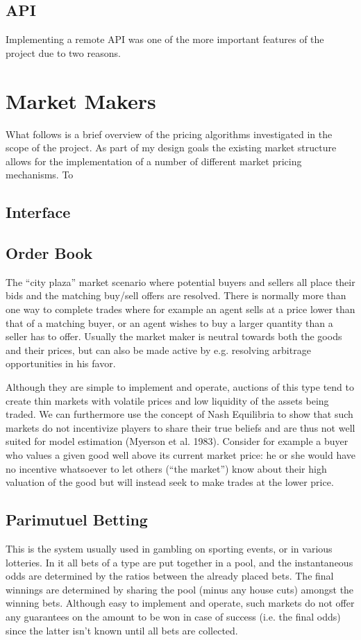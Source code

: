 \documentclass[bsc,frontabs,twoside,singlespacing,parskip,deptreport]{infthesis}     %
\begin{document}
\subsection{API}
	Implementing a remote API was one of the more important features of the project due to two reasons. 
\section{Market Makers}
	What follows is a brief overview of the pricing algorithms investigated in the scope of the project. As part of my design goals the existing market structure allows for the implementation of a number of different market pricing mechanisms. To 

\subsection{Interface}
	
\subsection{Order Book}
	
	The “city plaza” market scenario where potential buyers and sellers all place their bids and the matching buy/sell offers are resolved. There is normally more than one way to complete trades where for example an agent sells at a price lower than that of a matching buyer, or an agent wishes to buy a larger quantity than a seller has to offer. Usually the market maker is neutral towards both the goods and their prices, but can also be made active by e.g. resolving arbitrage opportunities in his favor.

	Although they are simple to implement and operate, auctions of this type tend to create thin markets with volatile prices and low liquidity of the assets being traded. We can furthermore use the concept of Nash Equilibria to show that such markets do not incentivize players to share their true beliefs and are thus not well suited for model estimation (Myerson et al. 1983). Consider for example a buyer who values a given good well above its current market price: he or she would have no incentive whatsoever to let others (“the market”) know about their high valuation of the good but will instead seek to make trades at the lower price.
\subsection{Parimutuel Betting}
This is the system usually used in gambling on sporting events, or in various lotteries. In it all bets of a type are put together in a pool, and the instantaneous odds are determined by the ratios between the already placed bets. The final winnings are determined by sharing the pool (minus any house cuts) amongst the winning bets. Although easy to implement and operate, such markets do not offer any guarantees on the amount to be won in case of success (i.e. the final odds) since the latter isn’t known until all bets are collected.
\end{document}
